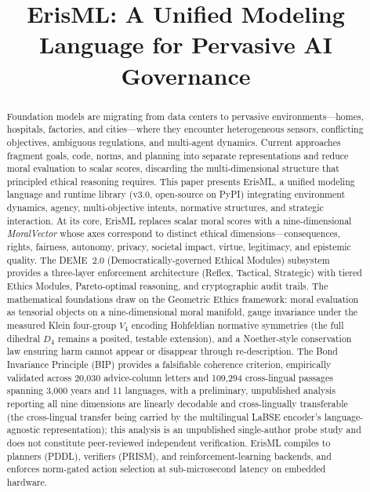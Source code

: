 \documentclass[conference]{IEEEtran}
\begin{document}
\title{ErisML: A Unified Modeling Language for Pervasive AI Governance}

\author{
}

\maketitle

\begin{abstract}
Foundation models are migrating from data centers to pervasive environments---homes, hospitals, factories, and cities---where they encounter heterogeneous sensors, conflicting objectives, ambiguous regulations, and multi-agent dynamics. Current approaches fragment goals, code, norms, and planning into separate representations and reduce moral evaluation to scalar scores, discarding the multi-dimensional structure that principled ethical reasoning requires. This paper presents ErisML, a unified modeling language and runtime library (v3.0, open-source on PyPI) integrating environment dynamics, agency, multi-objective intents, normative structures, and strategic interaction. At its core, ErisML replaces scalar moral scores with a nine-dimensional \emph{MoralVector} whose axes correspond to distinct ethical dimensions---consequences, rights, fairness, autonomy, privacy, societal impact, virtue, legitimacy, and epistemic quality. The DEME~2.0 (Democratically-governed Ethical Modules) subsystem provides a three-layer enforcement architecture (Reflex, Tactical, Strategic) with tiered Ethics Modules, Pareto-optimal reasoning, and cryptographic audit trails. The mathematical foundations draw on the Geometric Ethics framework: moral evaluation as tensorial objects on a nine-dimensional moral manifold, gauge invariance under the measured Klein four-group $V_4$ encoding Hohfeldian normative symmetries (the full dihedral $D_4$ remains a posited, testable extension), and a Noether-style conservation law ensuring harm cannot appear or disappear through re-description. The Bond Invariance Principle (BIP) provides a falsifiable coherence criterion, empirically validated across 20,030 advice-column letters and 109,294 cross-lingual passages spanning 3,000 years and 11 languages, with a preliminary, unpublished analysis reporting all nine dimensions are linearly decodable and cross-lingually transferable (the cross-lingual transfer being carried by the multilingual LaBSE encoder's language-agnostic representation); this analysis is an unpublished single-author probe study and does not constitute peer-reviewed independent verification. ErisML compiles to planners (PDDL), verifiers (PRISM), and reinforcement-learning backends, and enforces norm-gated action selection at sub-microsecond latency on embedded hardware.
\end{abstract}
\end{document}
